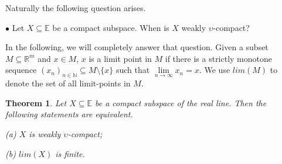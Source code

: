 \documentclass[preprint,12pt]{elsarticle}
\numberwithin{equation}{section}
\newtheorem{theorem}{Theorem}[section]
\begin{document}
\quad Naturally the following question arises.

$\bullet$ Let $X\subseteq\mathbb{E}$ be a compact subspace. When is $X$  weakly $\upsilon$-compact?

\quad In the following, we will completely answer that question. Given a subset $M\subseteq \mathbb{R}^{m}$ and $x\in M$, $x$ is a limit point in $M$ if there is a strictly monotone sequence $(x_{n})_{n\in\mathbb{N}}\subseteq M\setminus\{x\}$ such that $\lim\limits_{n\longrightarrow\infty}x_{n}=x$. We use $lim(M)$ to denote the set of all limit-points in $M$.

\begin{theorem} Let $X\subseteq\mathbb{E}$ be a compact subspace of the real line. Then the following statements are equivalent.

(a) $X$ is weakly $\upsilon$-compact;

(b) $lim(X)$ is finite.
\end{theorem}
\end{document}
